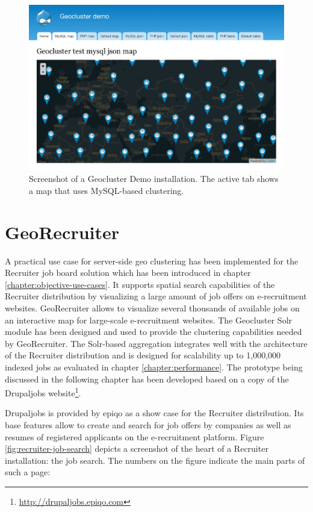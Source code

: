 \begin{figure}[h]
  \begin{center}
    \includegraphics[width=1\textwidth]{figures/geocluster_demo_site.png}
    \caption{Screenshot of a Geocluster Demo installation. The active tab shows a map that uses MySQL-based clustering.}
    \label{fig:geocluster-demo-site}
  \end{center}
\end{figure}

\section{GeoRecruiter}
\label{chapter:use-case-georecruiter}

A practical use case for server-side geo clustering has been implemented for the Recruiter job board solution which has been introduced in chapter \ref{chapter:objective-use-cases}. It supports spatial search capabilities of the Recruiter distribution by visualizing a large amount of job offers on e-recruitment websites. GeoRecruiter allows to visualize several thousands of available jobs on an interactive map for large-scale e-recruitment websites. The Geocluster Solr module has been designed and used to provide the clustering capabilities needed by GeoRecruiter. The Solr-based aggregation integrates well with the architecture of the Recruiter distribution and is designed for scalability up to 1,000,000 indexed jobs as evaluated in chapter \ref{chapter:performance}. The prototype being discussed in the following chapter has been developed based on a copy of the Drupaljobs website\footnote{\url{http://drupaljobs.epiqo.com}}.

Drupaljobs is provided by epiqo as a show case for the Recruiter distribution. Its base features allow to create and search for job offers by companies as well as resumes of registered applicants on the e-recruitment platform. Figure \ref{fig:recruiter-job-search} depicts a screenshot of the heart of a Recruiter installation: the job search. The numbers on the figure indicate the main parts of such a page:

